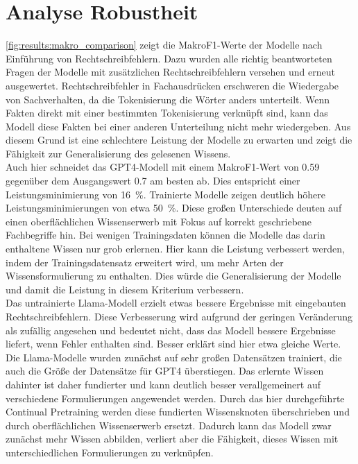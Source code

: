 \section{Analyse Robustheit}\label{sec:results:robustness}
\cref{fig:results:makro_comparison} zeigt die MakroF1-Werte der Modelle nach Einführung von Rechtschreibfehlern.
Dazu wurden alle richtig beantworteten Fragen der Modelle mit zusätzlichen Rechtschreibfehlern versehen und erneut ausgewertet.
Rechtschreibfehler in Fachausdrücken erschweren die Wiedergabe von Sachverhalten, da die Tokenisierung die Wörter anders unterteilt.
Wenn Fakten direkt mit einer bestimmten Tokenisierung verknüpft sind, kann das Modell diese Fakten bei einer anderen Unterteilung nicht mehr wiedergeben.
Aus diesem Grund ist eine schlechtere Leistung der Modelle zu erwarten und zeigt die Fähigkeit zur Generalisierung des gelesenen Wissens.\\

Auch hier schneidet das GPT4-Modell mit einem MakroF1-Wert von \num{0.59} gegenüber dem Ausgangswert \num{0.7} am besten ab.
Dies entspricht einer Leistungsminimierung von \SI{16}{\percent}. Trainierte Modelle zeigen deutlich höhere Leistungsminimierungen von etwa \SI{50}{\percent}.
Diese großen Unterschiede deuten auf einen oberflächlichen Wissenserwerb mit Fokus auf korrekt geschriebene Fachbegriffe hin.
Bei wenigen Trainingsdaten können die Modelle das darin enthaltene Wissen nur grob erlernen.
Hier kann die Leistung verbessert werden, indem der Trainingsdatensatz erweitert wird, um mehr Arten der Wissensformulierung zu enthalten.
Dies würde die Generalisierung der Modelle und damit die Leistung in diesem Kriterium verbessern.\\

Das untrainierte Llama-Modell erzielt etwas bessere Ergebnisse mit eingebauten Rechtschreibfehlern.
Diese Verbesserung wird aufgrund der geringen Veränderung als zufällig angesehen und bedeutet nicht, dass das Modell bessere Ergebnisse liefert, wenn Fehler enthalten sind.
Besser erklärt sind hier etwa gleiche Werte.
Die Llama-Modelle wurden zunächst auf sehr großen Datensätzen trainiert, die auch die Größe der Datensätze für GPT4 überstiegen.
Das erlernte Wissen dahinter ist daher fundierter und kann deutlich besser verallgemeinert auf verschiedene Formulierungen angewendet werden.
Durch das hier durchgeführte Continual Pretraining werden diese fundierten Wissensknoten überschrieben und durch oberflächlichen Wissenserwerb ersetzt.
Dadurch kann das Modell zwar zunächst mehr Wissen abbilden, verliert aber die Fähigkeit, dieses Wissen mit unterschiedlichen Formulierungen zu verknüpfen.\\

